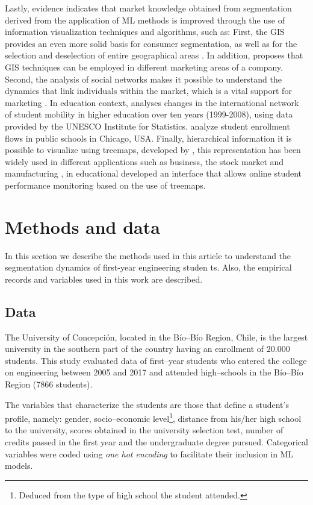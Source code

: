 \documentclass[5p,authoryear,preprint,12pt]{elsarticle}
\begin{document}
Lastly, evidence indicates that market knowledge obtained from segmentation derived from the application of ML methods is improved through the use of information visualization techniques and algorithms, such as: First, the GIS provides an even more solid basis for consumer segmentation, as well as for the selection and deselection of entire geographical areas \citep{pridmore2017market}. In addition, \citet{quesada2017assessing} proposes that GIS techniques can be employed in different marketing areas of a company. Second, the analysis of social networks makes it possible to understand the dynamics that link individuals within the market, which is a vital support for marketing \citep{webster2004network}. In education context, \citet{shields2013globalization} analyses changes in the international network of student mobility in higher education over ten years (1999-2008), using data provided by the UNESCO Institute for Statistics. \citet{sirer2015currents} analyze student enrollment flows in public schools in Chicago, USA. Finally, hierarchical information it is possible to visualize using treemaps, developed by \citet{shneiderman1992tree}, this representation has been widely used in different applications such as business, the stock market and manufacturing \citep [see,][]{keivanpour2019adapting}, in educational \citet{keivanpour2019adapting} developed an interface that allows online student performance monitoring based on the use of treemaps.

\section{Methods and data}
In this section we describe the methods used in this article to understand the segmentation dynamics of first-year engineering studen	ts. Also, the empirical records and variables used in this work are described.

\subsection{Data}

The University of Concepción, located in the B\'io--B\'io Region, Chile, is the largest university in the southern part of the country having an enrollment of $20.000$ students. This study evaluated data of first--year students who entered the college on engineering between 2005 and 2017 and attended high--schools in the B\'io--B\'io Region (7866 students).

The variables that characterize the students are those that define a student's profile, namely: gender, socio--economic level\footnote{Deduced from the type of high school the student attended.}, distance from his/her high school to the university, scores obtained in the university selection test, number of credits passed in the first year and the undergraduate degree pursued. Categorical variables were coded using \emph{one hot encoding} to facilitate their inclusion in ML models.
\end{document}
